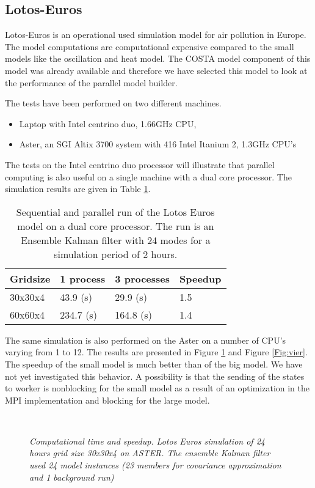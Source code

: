 \subsection{Lotos-Euros}
Lotos-Euros is an operational used simulation model for air pollution in
Europe. The model computations are computational expensive compared to the
small models like the oscillation and heat model. The COSTA model component
of this model was already available and therefore we have selected this
model to look at the performance of the parallel model builder.

The tests have been performed on two different machines.
\begin{itemize}
\item Laptop with Intel centrino duo, 1.66GHz CPU,
\item Aster, an SGI Altix 3700 system with 416 Intel Itanium 2, 1.3GHz CPU's
\end{itemize}

The tests on the Intel centrino duo processor will illustrate that parallel
computing is also useful on a single machine with a dual core processor.
The simulation results are given in Table \ref{Table:Lotos Laptop}. 

\begin{table}[h]
\begin{tabular}{|l|lll|}
\hline
Gridsize & 1 process & 3 processes & Speedup \\
\hline
30x30x4 & 43.9 (s) & 29.9 (s) & 1.5 \\
60x60x4 & 234.7 (s) & 164.8 (s) & 1.4 \\
\hline
\end{tabular}
\caption{Sequential and parallel run of the Lotos Euros model on a
dual core processor. The run is an Ensemble Kalman filter with 24 modes for
a simulation period of 2 hours.}
\label{Table:Lotos Laptop}
\end{table}

The same simulation is also performed on the Aster on a number of CPU's
varying from 1 to 12. The results are presented in Figure \ref{Fig:drie}
and Figure \ref{Fig:vier}. The speedup of the small model is much better
than of the big model. We have not yet investigated this behavior.
A possibility is that the sending of the states to worker is
nonblocking for the small model as a result of an optimization in the MPI
implementation and blocking for the large model.

\begin{figure}
\hbox{
      }

\caption{\em Computational time and speedup. Lotos Euros simulation of 24 
             hours grid size 30x30x4 on ASTER. The ensemble Kalman filter
             used 24 model instances (23 members for covariance approximation
             and 1 background run)}
\label{Fig:drie}
\end{figure}

